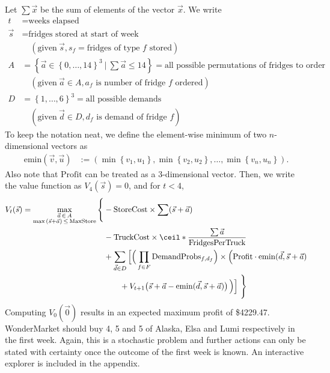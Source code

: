 \documentclass[11pt,a4paper]{article}
\begin{document}
Let $\sum \vec x$ be the sum of elements of the vector $\vec x$. 
We write 
\begin{align*}
    t &= \text{weeks elapsed} \\ 
    \vec s &= \text{fridges stored at start of week} \\ 
    & \quad (\text{given}~\vec s, s_f = \text{fridges of type $f$ stored}) \\ 
    A &= \left\{ \vec a \in \left\{ 0, \ldots, 14\right\}^3 ~|~ \sum \vec a \le 14 \right\}  = \text{all possible permutations of fridges to order} \\ 
    & \quad (\text{given}~\vec a \in A, a_f \text{ is number of fridge $f$ ordered}) \\
    D &= \left\{ 1, \ldots, 6\right\}^3 = \text{all possible demands}  \\ 
    & \quad (\text{given}~\vec d \in D, d_f \text{ is demand of fridge $f$}) 
\end{align*}
To keep the notation neat, we define the 
element-wise minimum of two $n$-dimensional vectors as 
\begin{align*}
     \mathrm{emin}( \vec v, \vec u ) &:= \left( \min \left\{ v_1, u_1 \right\}, \min \left\{ v_2, u_2 \right\}, \ldots, \min \left\{ v_n, u_n \right\} \right).
\end{align*}
Also note that $\mathrm{Profit}$ can be treated as a 3-dimensional vector. 
Then, we write the value function as $V_4(\vec s) = 0$, and for $t<4$,
\begin{align*}
    V_{t}(\vec s) = 
    \max_{ \substack{\vec a \,\in\, A \\ \max \,(\vec s + \vec a)\, \le\, \mathrm{MaxStore} } }\Bigg\{& 
        -\mathrm{StoreCost}\times\sum(\vec s + \vec a) \\ 
        &-\mathrm{TruckCost}\times \ceil*{\frac{\sum \vec a}{\mathrm{FridgesPerTruck}}} \\ 
        & + \sum_{\vec d \in D} \Big[\Big(\prod_{f \in F}\mathrm{DemandProbs}_{f,d_f} \Big)\times \Big( \mathrm{Profit} \cdot \mathrm{emin} ( \vec d, \vec s + \vec a)   \\ 
        & \qquad + V_{t+1} \big(\vec s + \vec a - \mathrm{emin} (\vec d, \vec s + \vec a)\big)\,\Big) \Big]\,\,\Bigg\}
\end{align*}
Computing $V_0(\vec 0)$ results in an expected maximum profit of 
\$4229.47. WonderMarket should buy 4, 5 and 5 of Alaska, Elsa and Lumi respectively 
in the first week. Again, this is a stochastic problem and further actions 
can only be stated with certainty once the outcome of the first week is known.
An interactive explorer is included in the appendix.
\end{document}
